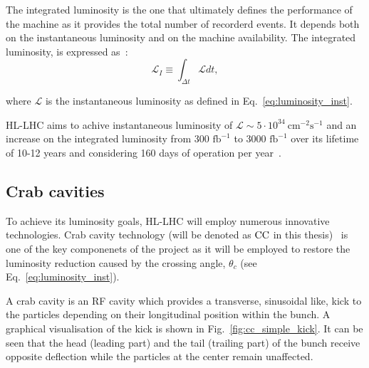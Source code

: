 The integrated luminosity is the one that ultimately defines the performance of the machine as it provides the total number of recorderd events. It depends both on the instantaneous luminosity and on the machine availability. The integrated luminosity, is expressed as~\cite{HL_LHC_yellow_report}:
\begin{equation}\label{eq:integrated_luminosity}
    \mathcal{L}_I \equiv \int_{\Delta t} \mathcal{L} dt,
\end{equation}

where $\mathcal{L}$ is the instantaneous luminosity as defined in Eq.~\eqref{eq:luminosity_inst}.

HL-LHC aims to achive instantaneous luminosity of $\mathcal{L} \sim 5 \cdot 10^{34} \ \mathrm{cm^{-2} s^{-1}}$ and an increase on the integrated luminosity from 300 $\mathrm{fb^{-1}}$ to 3000 $\mathrm{fb^{-1}}$ over its lifetime of 10-12 years and considering 160 days of operation per year~\cite{Brunning_Rossi}. %



\subsection{Crab cavities}\label{subsec:CC_intro}
To achieve its luminosity goals, HL-LHC will employ numerous innovative technologies. Crab cavity technology (will be denoted as ${\mathrm{CC}}$ in this thesis)~\cite{Calaga:2673544} is one of the key componenets of the project as it will be employed to restore the luminosity reduction caused by the crossing angle, $\theta_c$ (see Eq.~\eqref{eq:luminosity_inst}).

A crab cavity is an RF cavity which provides a transverse, sinusoidal like, kick to the particles depending on their longitudinal position within the bunch. A graphical visualisation of the kick is shown in Fig.~\ref{fig:cc_simple_kick}. It can be seen that the head (leading part) and the tail (trailing part) of the bunch receive opposite deflection while the particles at the center remain unaffected.


